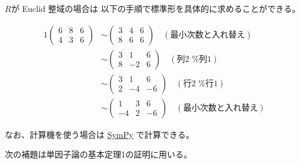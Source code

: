 \documentclass[report]{jlreq}
\begin{document}
$R$が Euclid 整域の場合は
以下の手順で標準形を具体的に求めることができる。

\begin{example}[標準形の計算]
    \begin{alignat}{1}
        \begin{pmatrix}
            6 & 8 & 6 \\
            4 & 3 & 6
        \end{pmatrix}
            &\sim \begin{pmatrix}
                3 & 4 & 6 \\
                8 & 6 & 6
            \end{pmatrix}
                \quad (\text{最小次数と入れ替え}) \\
            &\sim \begin{pmatrix}
                3 & 1 & 6 \\
                8 & -2 & 6
            \end{pmatrix}
                \quad (\text{列2 \% 列1}) \\
            &\sim \begin{pmatrix}
                3 & 1 & 6 \\
                2 & -4 & -6
            \end{pmatrix}
                \quad (\text{行2 \% 行1}) \\
            &\sim \begin{pmatrix}
                1 & 3 & 6 \\
                -4 & 2 & -6
            \end{pmatrix}
                \quad (\text{最小次数と入れ替え})
    \end{alignat}

    なお、計算機を使う場合は
    \href{https://docs.sympy.org/latest/modules/matrices/normalforms.html#sympy.matrices.normalforms.smith_normal_form}
        {SymPy}
    で計算できる。
\end{example}

次の補題は単因子論の基本定理1の証明に用いる。
\end{document}
